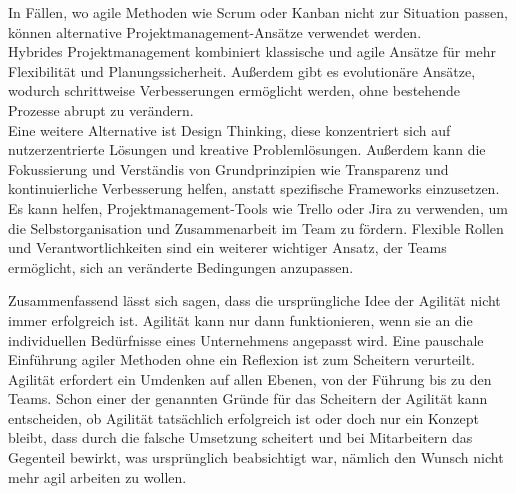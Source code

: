 \documentclass[ngerman]{seminarvorlage}
\begin{document}
In Fällen, wo agile Methoden wie Scrum oder Kanban nicht zur Situation passen, können alternative Projektmanagement-Ansätze verwendet werden.\\ 
Hybrides Projektmanagement kombiniert klassische und agile Ansätze für mehr Flexibilität und Planungssicherheit. Außerdem gibt es evolutionäre Ansätze, wodurch schrittweise Verbesserungen ermöglicht werden, ohne bestehende Prozesse abrupt zu verändern.\\ Eine weitere Alternative ist Design Thinking, diese konzentriert sich auf nutzerzentrierte Lösungen und kreative Problemlösungen. Außerdem kann die Fokussierung und Verständis von Grundprinzipien wie Transparenz und kontinuierliche Verbesserung helfen, anstatt spezifische Frameworks einzusetzen. Es kann helfen, Projektmanagement-Tools wie Trello oder Jira zu verwenden, um die Selbstorganisation und Zusammenarbeit im Team zu fördern. Flexible Rollen und Verantwortlichkeiten sind ein weiterer wichtiger Ansatz, der Teams ermöglicht, sich an veränderte Bedingungen anzupassen.

Zusammenfassend lässt sich sagen, dass die ursprüngliche Idee der Agilität nicht immer erfolgreich ist. Agilität kann nur dann funktionieren, wenn sie an die individuellen Bedürfnisse eines Unternehmens angepasst wird. Eine pauschale Einführung agiler Methoden ohne ein Reflexion ist zum Scheitern verurteilt.\\ Agilität erfordert ein Umdenken auf allen Ebenen, von der Führung bis zu den Teams. Schon einer der genannten Gründe für das Scheitern der Agilität kann entscheiden, ob Agilität tatsächlich erfolgreich ist oder doch nur ein Konzept bleibt, dass durch die falsche Umsetzung scheitert und bei Mitarbeitern das Gegenteil bewirkt, was ursprünglich beabsichtigt war, nämlich den Wunsch nicht mehr agil arbeiten zu wollen.






%
%


\end{document}
